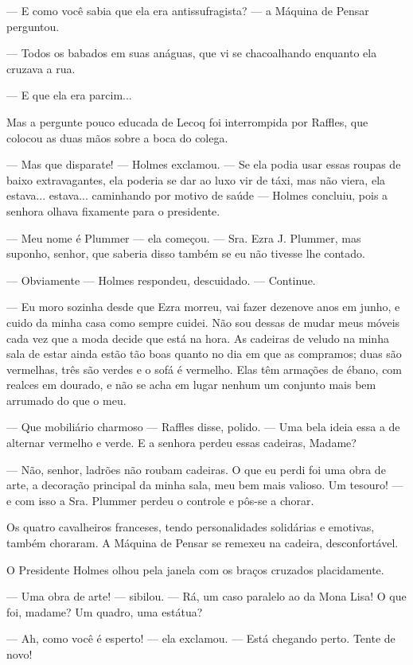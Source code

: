 --- E como você sabia que ela era antissufragista? --- a Máquina de
Pensar perguntou.

--- Todos os babados em suas anáguas, que vi se chacoalhando enquanto
ela cruzava a rua.

--- E que ela era parcim...

Mas a pergunte pouco educada de Lecoq foi interrompida por Raffles, que
colocou as duas mãos sobre a boca do colega.

--- Mas que disparate! --- Holmes exclamou. --- Se ela podia usar essas
roupas de baixo extravagantes, ela poderia se dar ao luxo vir de táxi,
mas não viera, ela estava... estava... caminhando por motivo de saúde
--- Holmes concluiu, pois a senhora olhava fixamente para o presidente.

--- Meu nome é Plummer --- ela começou. --- Sra. Ezra J. Plummer, mas
suponho, senhor, que saberia disso também se eu não tivesse lhe contado.

--- Obviamente --- Holmes respondeu, descuidado. --- Continue.

--- Eu moro sozinha desde que Ezra morreu, vai fazer dezenove anos em
junho, e cuido da minha casa como sempre cuidei. Não sou dessas de mudar
meus móveis cada vez que a moda decide que está na hora. As cadeiras de
veludo na minha sala de estar ainda estão tão boas quanto no dia em que
as compramos; duas são vermelhas, três são verdes e o sofá é vermelho.
Elas têm armações de ébano, com realces em dourado, e não se acha em
lugar nenhum um conjunto mais bem arrumado do que o meu.

--- Que mobiliário charmoso --- Raffles disse, polido. --- Uma bela
ideia essa a de alternar vermelho e verde. E a senhora perdeu essas
cadeiras, Madame?

--- Não, senhor, ladrões não roubam cadeiras. O que eu perdi foi uma
obra de arte, a decoração principal da minha sala, meu bem mais valioso.
Um tesouro! --- e com isso a Sra. Plummer perdeu o controle e pôs-se a
chorar.

Os quatro cavalheiros franceses, tendo personalidades solidárias e
emotivas, também choraram. A Máquina de Pensar se remexeu na cadeira,
desconfortável.

O Presidente Holmes olhou pela janela com os braços cruzados
placidamente.

--- Uma obra de arte! --- sibilou. --- Rá, um caso paralelo ao da Mona
Lisa! O que foi, madame? Um quadro, uma estátua?

--- Ah, como você é esperto! --- ela exclamou. --- Está chegando perto.
Tente de novo!

